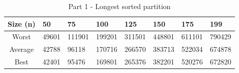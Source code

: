 \usepackage{array}

\begin{table}[h!]
\begin{center}
\begin{tabular}{|c|m{0.80cm}|m{0.80cm}|m{0.80cm}|m{0.80cm}|m{0.80cm}|m{0.80cm}|m{1cm}|} 
 \hline
 Size (n) & 50 & 75 & 100 & 125 & 150 & 175 & 199 \\
 \hline\hline
 Worst & 49601 & 111901 & 199201 & 311501 & 448801 & 611101 & 790429 \\
 \hline
 Average & 42788 & 96118 & 170716 & 266570 & 383713 & 522034 & 674878 \\
 \hline
 Best & 42401 & 95476 & 169801 & 265376 & 382201 & 520276 & 672820 \\
 \hline
\end{tabular}
\label{partition_table}
\caption{Part 1 - Longest sorted partition}
\end{center}
\end{table}
